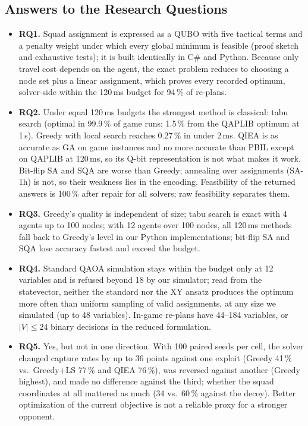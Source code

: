 \documentclass[12pt, a4paper]{article}
\begin{document}
\subsection*{Answers to the Research Questions}

\begin{itemize}
\item \textbf{RQ1.} Squad assignment is expressed as a QUBO with five tactical terms and a penalty weight under which every global minimum is feasible (proof sketch and exhaustive tests); it is built identically in C\# and Python. Because only travel cost depends on the agent, the exact problem reduces to choosing a node set plus a linear assignment, which proves every recorded optimum, solver-side within the 120\,ms budget for 94\,\% of re-plans.
\item \textbf{RQ2.} Under equal 120\,ms budgets the strongest method is classical: tabu search (optimal in 99.9\,\% of game runs; 1.5\,\% from the QAPLIB optimum at 1\,s). Greedy with local search reaches 0.27\,\% in under 2\,ms. QIEA is as accurate as GA on game instances and no more accurate than PBIL except on QAPLIB at 120\,ms, so its Q-bit representation is not what makes it work. Bit-flip SA and SQA are worse than Greedy; annealing over assignments (SA-1h) is not, so their weakness lies in the encoding. Feasibility of the returned answers is 100\,\% after repair for all solvers; raw feasibility separates them.
\item \textbf{RQ3.} Greedy's quality is independent of size; tabu search is exact with 4 agents up to 100 nodes; with 12 agents over 100 nodes, all 120\,ms methods fall back to Greedy's level in our Python implementations; bit-flip SA and SQA lose accuracy fastest and exceed the budget.
\item \textbf{RQ4.} Standard QAOA simulation stays within the budget only at 12 variables and is refused beyond 18 by our simulator; read from the statevector, neither the standard nor the XY ansatz produces the optimum more often than uniform sampling of valid assignments, at any size we simulated (up to 48 variables). In-game re-plans have 44--184 variables, or $|V|\le24$ binary decisions in the reduced formulation.
\item \textbf{RQ5.} Yes, but not in one direction. With 100 paired seeds per cell, the solver changed capture rates by up to 36 points against one exploit (Greedy 41\,\% vs.\ Greedy+LS 77\,\% and QIEA 76\,\%), was reversed against another (Greedy highest), and made no difference against the third; whether the squad coordinates at all mattered as much (34 vs.\ 60\,\% against the decoy). Better optimization of the current objective is not a reliable proxy for a stronger opponent.
\end{itemize}
\end{document}
